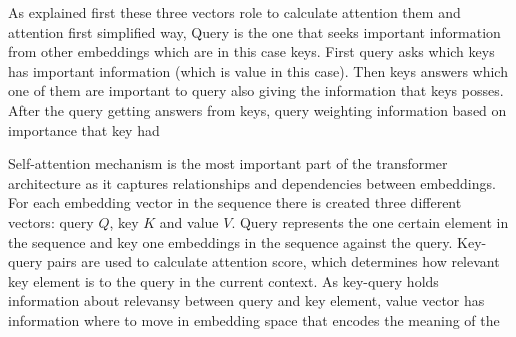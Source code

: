 

As explained first these three vectors role to calculate attention them and attention first simplified way, Query is the one that seeks important information from other embeddings which are in this case keys. First query asks which keys has important information (which is value in this case). Then keys answers which one of them are important to query also giving the information that keys posses. After the query getting answers from keys, query weighting information based on importance that key had


Self-attention mechanism is the most important part of the transformer architecture as it captures relationships and dependencies between embeddings. For each embedding vector in the sequence there is created three different vectors: query $Q$, key  $K$ and value  $V$. 
Query represents the one certain element in the sequence and key one embeddings in the sequence against the query. Key-query pairs are used to calculate attention score, which determines how relevant key element is to the query in the current context. As key-query holds information about relevansy between query and key element, value vector has information where to move in embedding space that encodes the meaning of the 





